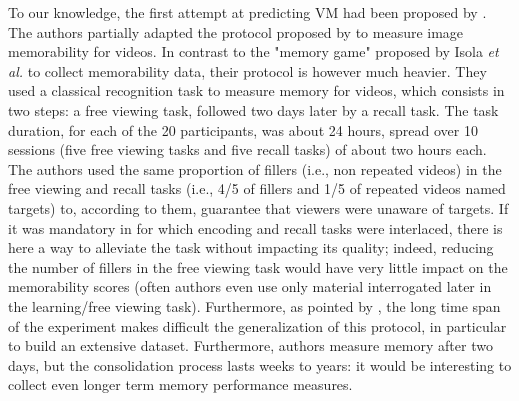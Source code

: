 \documentclass[sigconf]{acmart}
\begin{document}
To our knowledge, the first attempt at predicting VM had been proposed by \cite{han_2015_learning}. 
The authors partially adapted the protocol proposed by \cite{isola_2011_makes} to measure image memorability for videos.
In contrast to the "memory game" proposed by Isola \textit{et al.} to collect memorability data, their protocol is however much heavier.
They used a classical recognition task to measure memory for videos, which consists in two steps: a free viewing task, followed two days later by a recall task.
The task duration, for each of the 20 participants, was about 24 hours, spread over 10 sessions (five free viewing tasks and five recall tasks) of about two hours each.
The authors used the same proportion of fillers (i.e., non repeated videos) in the free viewing and recall tasks (i.e., 4/5 of fillers and 1/5 of repeated videos named targets) to, according to them, guarantee that viewers were unaware of targets.
If it was mandatory in \cite{isola_2011_makes} for which encoding and recall tasks were interlaced, there is here a way to alleviate the task without impacting its quality; indeed, reducing the number of fillers in the free viewing task would have very little impact on the memorability scores (often authors even use only material interrogated later in the learning/free viewing task).
Furthermore, as pointed by \cite{shekhar_2017_show}, the long time span of the experiment makes difficult the generalization of this protocol, in particular to build an extensive dataset.
Furthermore, authors measure memory after two days, but the consolidation process lasts weeks to years: it would be interesting to collect even longer term memory performance measures.
\end{document}
